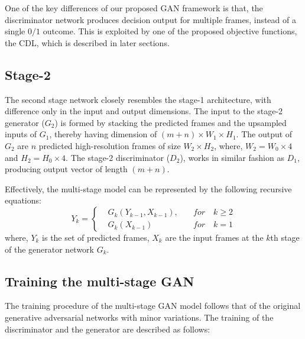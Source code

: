 \documentclass{article}
\begin{document}
	  One of the key differences of our proposed GAN framework is that, the discriminator network produces decision output for multiple frames, instead of a single $ 0/1 $ outcome. This is exploited by one of the proposed objective functions, the CDL, which is described in later sections.
  
  \subsection{Stage-2}
	  The second stage network closely resembles the stage-1 architecture, with difference only in the input and output dimensions. The input to the stage-2 generator ($ G_2 $) is formed by stacking the predicted frames and the upsampled inputs of $ G_1 $, thereby having dimension of $ (m + n) \times W_1 \times H_1 $.
	  The output of $ G_2 $ are $ n $ predicted high-resolution frames of size $ W_2 \times H_2 $, where, $ W_2 = W_0 \times 4 $ and $ H_2 = H_0 \times 4 $. The stage-2 discriminator ($ D_2 $), works in similar fashion as $ D_1 $, producing output vector of length $ (m + n) $.
	  
	  Effectively, the multi-stage model can be represented by the following recursive equations:
	  \begin{equation}
	  	Y_k = \left\{\begin{alignedat}{2}
	  	& G_k(Y_{k-1}, X_{k-1}), \quad & for \quad k \geq 2 \\ & G_k(X_{k-1}) &  for \quad k = 1
	  	\end{alignedat}\right.
	  	\label{eq:multi-gan}
	  \end{equation}
	  where, $ Y_k $ is the set of predicted frames, $ X_k $ are the input frames at the $ k $th stage of the generator network $ G_k $.
  
\subsection{Training the multi-stage GAN}
  The training procedure of the multi-stage GAN model follows that of the original generative adversarial networks with minor variations. The training of the discriminator and the generator are described as follows:
\end{document}
